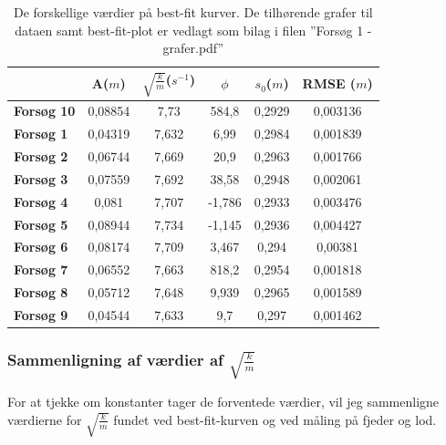 \begin{table}[h]
\centering
\begin{tabular}{|l|c|c|c|c|c|}
\hline
\textbf{}          & \textbf{A}($m$) & \textbf{$\sqrt{\frac{k}{m}}$}($s^{-1}$) & \textbf{$\phi$} & \textbf{$s_0$}($m$) & \textbf{RMSE }($m$) \\ \hline
\textbf{Forsøg 10} & 0,08854    & 7,73                          & 584,8           & 0,2929         & 0,003136      \\ \hline
\textbf{Forsøg 1}  & 0,04319    & 7,632                         & 6,99            & 0,2984         & 0,001839      \\ \hline
\textbf{Forsøg 2}  & 0,06744    & 7,669                         & 20,9            & 0,2963         & 0,001766      \\ \hline
\textbf{Forsøg 3}  & 0,07559    & 7,692                         & 38,58           & 0,2948         & 0,002061      \\ \hline
\textbf{Forsøg 4}  & 0,081      & 7,707                         & -1,786          & 0,2933         & 0,003476      \\ \hline
\textbf{Forsøg 5}  & 0,08944    & 7,734                         & -1,145          & 0,2936         & 0,004427      \\ \hline
\textbf{Forsøg 6}  & 0,08174    & 7,709                         & 3,467           & 0,294          & 0,00381       \\ \hline
\textbf{Forsøg 7}  & 0,06552    & 7,663                         & 818,2           & 0,2954         & 0,001818      \\ \hline
\textbf{Forsøg 8}  & 0,05712    & 7,648                         & 9,939           & 0,2965         & 0,001589      \\ \hline
\textbf{Forsøg 9}  & 0,04544    & 7,633                         & 9,7             & 0,297          & 0,001462      \\ \hline
\end{tabular}

\caption{De forskellige værdier på best-fit kurver. De tilhørende grafer til dataen samt best-fit-plot er vedlagt som bilag i filen ''Forsøg 1 - grafer.pdf''}
\label{tabel: bestfitkurver forsog 1}
\end{table}

\subsubsection{Sammenligning af værdier af $\sqrt{\frac{k}{m}}$}\label{exp1: teoretisk bestemmelse af sqrt k over m}
For at tjekke om konstanter tager de forventede værdier, vil jeg sammenligne værdierne for $\sqrt{\frac{k}{m}}$ fundet ved best-fit-kurven og ved måling på fjeder og lod.

